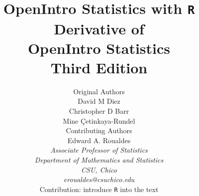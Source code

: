 \title{\huge OpenIntro Statistics with {\tt R} \\[2mm]
\large Derivative of \\
OpenIntro Statistics \\
Third Edition}
\author{\Large Original Authors \\[1.5mm]
\normalsize David M Diez \\
\normalsize Christopher D Barr \\
\normalsize Mine \c{C}etinkaya-Rundel \\[8mm]
\Large Contributing Authors \\[1.5mm]
\normalsize Edward A. Roualdes \\
\small\emph{Associate Professor of Statistics} \\
\small\emph{Department of Mathematics and Statistics} \\
\small\emph{CSU, Chico} \\
\small\emph{eroualdes@csuchico.edu} \\
\small Contribution: introduce {\tt R} into the text \\[2mm]
}

